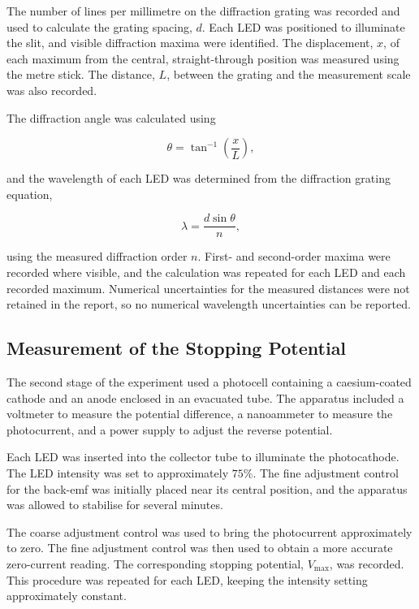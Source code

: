 \documentclass[12pt,a4paper]{article}
\begin{document}
The number of lines per millimetre on the diffraction grating was recorded and used to calculate the grating spacing, \(d\). Each LED was positioned to illuminate the slit, and visible diffraction maxima were identified. The displacement, \(x\), of each maximum from the central, straight-through position was measured using the metre stick. The distance, \(L\), between the grating and the measurement scale was also recorded.

The diffraction angle was calculated using

\begin{equation}
    \theta = \tan^{-1}\left(\frac{x}{L}\right),
\end{equation}

and the wavelength of each LED was determined from the diffraction grating equation,

\begin{equation}
    \lambda = \frac{d\sin\theta}{n},
\end{equation}

using the measured diffraction order \(n\). First- and second-order maxima were recorded where visible, and the calculation was repeated for each LED and each recorded maximum. Numerical uncertainties for the measured distances were not retained in the report, so no numerical wavelength uncertainties can be reported.

\subsection{Measurement of the Stopping Potential}

The second stage of the experiment used a photocell containing a caesium-coated cathode and an anode enclosed in an evacuated tube. The apparatus included a voltmeter to measure the potential difference, a nanoammeter to measure the photocurrent, and a power supply to adjust the reverse potential.

Each LED was inserted into the collector tube to illuminate the photocathode. The LED intensity was set to approximately \(75\%\). The fine adjustment control for the back-emf was initially placed near its central position, and the apparatus was allowed to stabilise for several minutes.

The coarse adjustment control was used to bring the photocurrent approximately to zero. The fine adjustment control was then used to obtain a more accurate zero-current reading. The corresponding stopping potential, \(V_{\max}\), was recorded. This procedure was repeated for each LED, keeping the intensity setting approximately constant.
\end{document}

